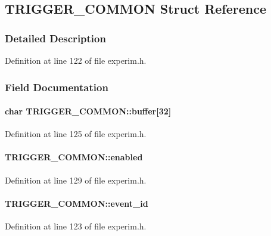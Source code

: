 \subsection{TRIGGER\_\-COMMON Struct Reference}
\label{structTRIGGER__COMMON}


\subsubsection{Detailed Description}


Definition at line 122 of file experim.h.

\subsubsection{Field Documentation}
\paragraph[{buffer}]{\setlength{\rightskip}{0pt plus 5cm}char {\bf TRIGGER\_\-COMMON::buffer}\mbox{[}32\mbox{]}}\hfill\label{structTRIGGER__COMMON_ac3c601127a5b073d255430e587f0a95f}


Definition at line 125 of file experim.h.
\paragraph[{enabled}]{ {\bf TRIGGER\_\-COMMON::enabled}}\hfill\label{structTRIGGER__COMMON_a5a6b90848204e71d6f873767244265e0}


Definition at line 129 of file experim.h.
\paragraph[{event\_\-id}]{ {\bf TRIGGER\_\-COMMON::event\_\-id}}\hfill\label{structTRIGGER__COMMON_aa3bce060ecd885cdaf25906da9afa4ad}


Definition at line 123 of file experim.h.
